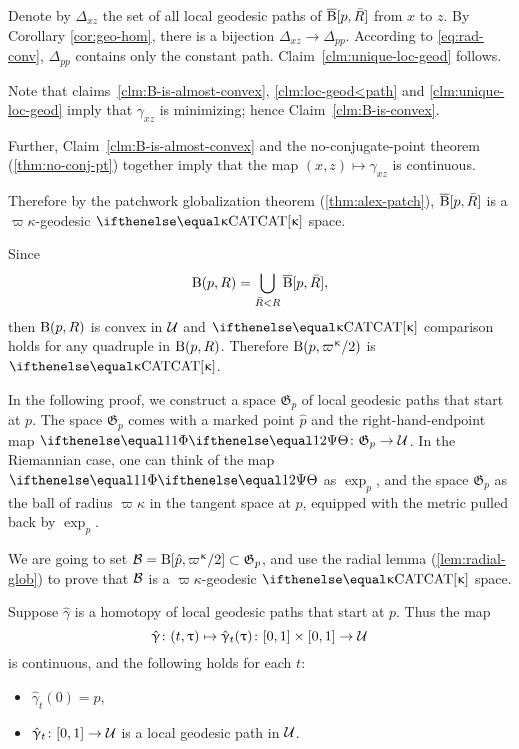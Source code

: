 Denote by $\Delta_{x z}$ the set of all local geodesic paths of $\overline{\mathrm{B}}{}[ p,\bar R]$ from $x$ to $z$.
By Corollary \ref{cor:geo-hom}, there is a  bijection $\Delta_{x z}\to\Delta_{ p p}$.
According to \ref{eq:rad-conv}, 
$\Delta_{ p p}$ contains only the constant path. Claim~\ref{clm:unique-loc-geod} follows.


Note that 
claims~\ref{clm:B-is-almost-convex}, 
\ref{clm:loc-geod<path} 
and \ref{clm:unique-loc-geod}
imply that $\gamma_{x z}$ is minimizing; hence Claim~\ref{clm:B-is-convex}.

Further, Claim~\ref{clm:B-is-almost-convex} and the no-conjugate-point theorem (\ref{thm:no-conj-pt}) together 
imply that the map $(x,z)\mapsto\gamma_{x z}$ is continuous.

Therefore by the patchwork globalization theorem (\ref{thm:alex-patch}), 
$\overline{\mathrm{B}}{}[ p,\bar R]$ is a $\varpi\kappa$-geodesic $\CAT\kappa$ space.

Since
\[\mathrm{B}{}( p,R)
=
\bigcup_{\bar R < R}\overline{\mathrm{B}}{}[ p,\bar R],\] 
then $\mathrm{B}{}( p,R)$ is convex in $\mathcal{U}$ and 
$\CAT\kappa$ comparison holds  for any quadruple in $\mathrm{B}{}( p,R)$.
Therefore $\oBall( p,\varpi\kappa/2)$ is $\CAT\kappa$.
\qeds


In the following proof, we construct a space $\mathfrak{G}_p$ of  local geodesic paths that start at $p$.
The space $\mathfrak{G}_p$ comes with 
a marked point $\hat p$ 
and the right-hand-endpoint map $\map\:\mathfrak{G}_p\to\spc{U}$.
In the Riemannian case, one can think of
the map $\map$  as $\exp_p$, and
the space $\mathfrak{G}_p$ as the ball of radius $\varpi\kappa$ in the tangent space at $p$, equipped with the metric pulled back by $\exp_p$.

We are going to set $\spc{B}=\oBall[\hat p,\varpi\kappa/2]\subset \mathfrak{G}_p$,
and use the radial lemma (\ref{lem:radial-glob}) to prove that $\mathcal{B}$ is a $\varpi\kappa$-geodesic $\CAT\kappa$ space.

Suppose $\hat\gamma$ is a homotopy of local geodesic paths that start at $p$.  Thus the map 
\[\hat\gamma\:(t,\tau)\mapsto\hat\gamma_t(\tau)\:[0,1]\times[0,1]\to\spc{U}\] 
is continuous,
and the following holds for each $t$:
\begin{itemize}
\item $\hat\gamma_t(0)=p$,
\item $\hat\gamma_t\:[0,1]\to\spc{U}$ is a local geodesic path in $\mathcal{U}$.
\end{itemize}

